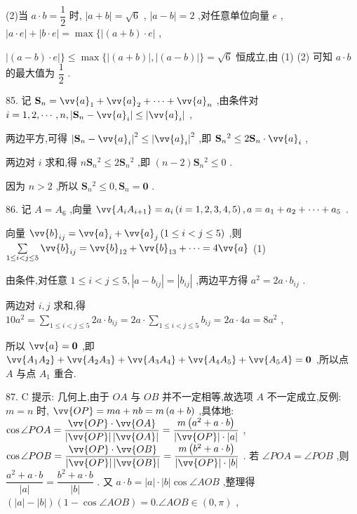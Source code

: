 (2)当 $a \cdot  b = \dfrac{1}{2}$ 时, $\left| {a + b}\right|  = \sqrt{6}$ , $\left| {a - b}\right|  = 2$ ,对任意单位向量 $e$ , $\left| {a \cdot  e}\right|  + \left| {b \cdot  e}\right|  = \max \{ \left| {\left( {a + b}\right)  \cdot  e}\right|$ ,

$\left| {\left( {a - b}\right)  \cdot  e}\right| \}  \leq  \max \{ \left| \left( {a + b}\right) \right| ,\left| \left( {a - b}\right) \right| \}  = \sqrt{6}$ 恒成立,由 (1) (2) 可知 $a \cdot  b$ 的最大值为 $\dfrac{1}{2}$ .

85. 记 ${\mathbf{S}}_{n} = {\vv{a}}_{1} + {\vv{a}}_{2} + \cdots  + {\vv{a}}_{n}$ ,由条件对 $i = 1,2,\cdots ,n,\left| {{\mathbf{S}}_{n} - {\vv{a}}_{i}}\right|  \leq  \left| {\vv{a}}_{i}\right|$ ,

两边平方,可得 ${\left| {\mathbf{S}}_{n} - {\vv{a}}_{i}\right| }^{2} \leq  {\left| {\vv{a}}_{i}\right| }^{2}$ ,即 ${\mathbf{S}}_{n}{}^{2} \leq  2{\mathbf{S}}_{n} \cdot  {\vv{a}}_{i}$ ,

两边对 $i$ 求和,得 $n{\mathbf{S}}_{n}{}^{2} \leq  2{\mathbf{S}}_{n}{}^{2}$ ,即 $\left( {n - 2}\right) {\mathbf{S}}_{n}{}^{2} \leq  0$ .

因为 $n > 2$ ,所以 ${\mathbf{S}}_{n}{}^{2} \leq  0,{\mathbf{S}}_{n} = \mathbf{0}$ .

86. 记 $A = {A}_{6}$ ,向量 $\vv{{A}_{i}{A}_{i + 1}} = {a}_{i}\left( {i = 1,2,3,4,5}\right) ,a = {a}_{1} + {a}_{2} + \cdots  + {a}_{5}$ .

向量 ${\vv{b}}_{ij} = {\vv{a}}_{i} + {\vv{a}}_{j}\left( {1 \leq  i < j \leq  5}\right)$ ,则 $\mathop{\sum }\limits_{{1 \leq  i < j \leq  5}}{\vv{b}}_{ij} = {\vv{b}}_{12} + {\vv{b}}_{13} + \cdots  = 4\vv{a}$ (1)

由条件,对任意 $1 \leq  i < j \leq  5,\left| {a - {b}_{ij}}\right|  = \left| {b}_{ij}\right|$ ,两边平方得 ${a}^{2} = {2a} \cdot  {b}_{ij}$ .

两边对 $i,j$ 求和,得 ${10}{a}^{2} = \mathop{\sum }\limits_{{1 \leq  i < j \leq  5}}{2a} \cdot  {b}_{ij} = {2a} \cdot  \mathop{\sum }\limits_{{1 \leq  i < j \leq  5}}{b}_{ij} = {2a} \cdot  {4a} = 8{a}^{2}$ ,

所以 $\vv{a} = \mathbf{0}$ ,即 $\vv{{A}_{1}{A}_{2}} + \vv{{A}_{2}{A}_{3}} + \vv{{A}_{3}{A}_{4}} + \vv{{A}_{4}{A}_{5}} + \vv{{A}_{5}A} = \mathbf{0}$ ,所以点 $A$ 与点 ${A}_{1}$ 重合.

87. C 提示: 几何上,由于 ${OA}$ 与 ${OB}$ 并不一定相等,故选项 $A$ 不一定成立,反例: $m = n$ 时, $\vv{OP} = {ma} + {nb} = m\left( {a + b}\right)$ ,具体地: $\cos \angle {POA} = \dfrac{\vv{OP} \cdot  \vv{OA}}{\left| \vv{OP}\right| \left| \vv{OA}\right| } = \dfrac{m\left( {{a}^{2} + a \cdot  b}\right) }{\left| \vv{OP}\right|  \cdot  \left| a\right| }$ , $\cos \angle {POB} = \dfrac{\vv{OP} \cdot  \vv{OB}}{\left| \vv{OP}\right| \left| \vv{OB}\right| } = \dfrac{m\left( {{b}^{2} + a \cdot  b}\right) }{\left| \vv{OP}\right|  \cdot  \left| b\right| }$ . 若 $\angle {POA} = \angle {POB}$ ,则 $\dfrac{{a}^{2} + a \cdot  b}{\left| a\right| } = \dfrac{{b}^{2} + a \cdot  b}{\left| b\right| }$ . 又 $a \cdot  b = \left| a\right|  \cdot  \left| b\right| \cos \angle {AOB}$ ,整理得 $\left( {\left| a\right|  - \left| b\right| }\right) \left( {1 - \cos \angle {AOB}}\right)  = 0.\angle {AOB} \in  \left( {0,\pi }\right)$ ,


